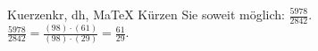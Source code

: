 \begin{MAufgabe}{Kuerzen}{kr, dh, MaTeX}
K\"urzen Sie soweit m\"oglich: $\frac{5978}{2842}$.\\ 
\ifLsg\MLoesung
\quad $\frac{5978}{2842}=\frac{(98)\cdot(61)}{(98)\cdot(29)}=\frac{61}{29}$.\else\relax\fi
 \end{MAufgabe}